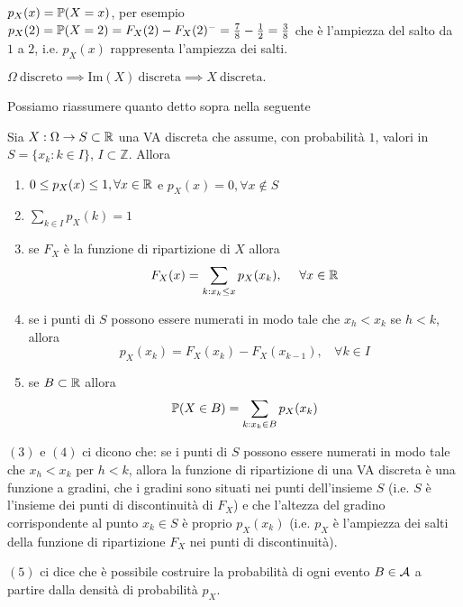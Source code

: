 $p_{X}(x) =\mathbb{P}(X=x)$, per esempio $p_{X}(2) =\mathbb{P}(X=2) =F_{X}(2) -F_{X}(2)^{-} =\frac{7}{8} -\frac{1}{2} =\frac{3}{8}$ che è l'ampiezza del salto da $1$ a $2$, i.e. $p_{X}(x)$ rappresenta l'ampiezza dei salti.
\begin{oss}
$\Omega \ \text{discreto} \implies \mathrm{Im}(X) \ \text{discreta} \implies X\ \text{discreta} .$
\end{oss}
Possiamo riassumere quanto detto sopra nella seguente
\begin{theorem}
Sia $X:\Omega \rightarrow S\subset \mathbb{R}$ una VA discreta che assume, con probabilità $1$, valori in $S=\{x_{k} :k\in I\}$, $I\subset \mathbb{Z}$. Allora
\end{theorem}
\begin{enumerate}
\item $0\leq p_{X}(x) \leq 1,\forall x\in \mathbb{R}$ e $p_{X}(x) =0,\forall x\notin S$
\item $\sum\limits_{k\in I} p_{X}(k) =1$
\item se $F_{X}$ è la funzione di ripartizione di $X$ allora
\begin{equation*}
F_{X}(x) =\sum\limits_{k:x_{k} \leq x} p_{X}(x_{k}) ,\ \ \ \ \forall x\in \mathbb{R}
\end{equation*}
\item se i punti di $S$ possono essere numerati in modo tale che $x_{h} < x_{k}$ se $h< k$, allora
\begin{equation*}
p_{X}(x_{k}) =F_{X}(x_{k}) -F_{X}(x_{k-1}) ,\ \ \ \ \forall k\in I
\end{equation*}
\item se $B\subset \mathbb{R}$ allora
\begin{equation*}
\mathbb{P}(X\in B) =\sum\limits_{k:x_{k} \in B} p_{X}(x_{k})
\end{equation*}
\end{enumerate}
\begin{oss}
$(3)$ e $(4)$ ci dicono che: se i punti di $S$ possono essere numerati in modo tale che $x_{h} < x_{k}$ per $h< k$, allora la funzione di ripartizione di una VA discreta è una funzione a gradini, che i gradini sono situati nei punti dell'insieme $S$ (i.e. $S$ è l'insieme dei punti di discontinuità di $F_{X}$) e che l'altezza del gradino corrispondente al punto $x_{k} \in S$ è proprio $p_{X}(x_{k})$ (i.e. $p_{X}$ è l'ampiezza dei salti della funzione di ripartizione $F_{X}$ nei punti di discontinuità).

$(5)$ ci dice che è possibile costruire la probabilità di ogni evento $B\in \mathcal{A}$ a partire dalla densità di probabilità $p_{X}$.
\end{oss}

